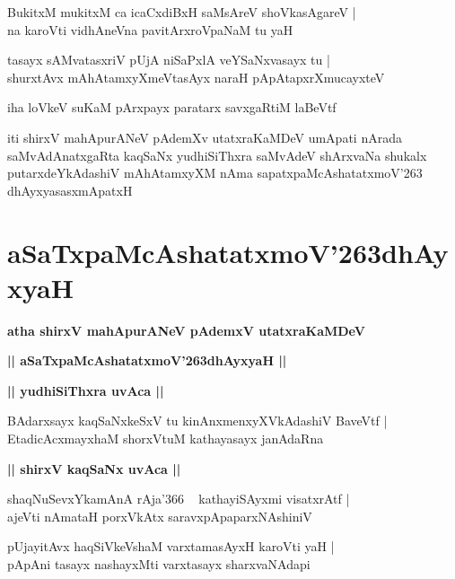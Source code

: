 \documentclass[twoside,12pt,openright]{book}
\def\S{\char'263}
\newcounter{shloka}[chapter]
\def\uvaca#1{\centerline{{\large\textbf{#1}}}}
\begin{document}
\begin{shloka}%
BukitxM mukitxM ca icaCxdiBxH saMsAreV shoVkasAgareV |\\
na karoVti vidhAneVna pavitArxroVpaNaM tu yaH 
\end{shloka}

\begin{shloka}%
tasayx sAMvatasxriV pUjA niSaPxlA veYSaNxvasayx tu |\\
shurxtAvx mAhAtamxyXmeVtasAyx naraH pApAtapxrXmucayxteV 
\end{shloka}

\begin{shloka}%
iha loVkeV suKaM pArxpayx paratarx savxgaRtiM laBeVtf
\end{shloka}

\begin{center}
iti shirxV mahApurANeV pAdemXv utatxraKaMDeV umApati nArada saMvAdAnatxgaRta kaqSaNx yudhiSiThxra 
saMvAdeV shArxvaNa shukalx putarxdeYkAdashiV mAhAtamxyXM nAma sapatxpaMcAshatatxmoV\S 
dhAyxyasasxmApatxH
\end{center}

\chapter{aSaTxpaMcAshatatxmoV\S dhAyxyaH}

\begin{center}
{\LARGE\bfseries atha shirxV mahApurANeV pAdemxV utatxraKaMDeV}
\end{center}

\begin{center}
{\LARGE\bfseries || aSaTxpaMcAshatatxmoV\S dhAyxyaH ||}
\end{center}

\uvaca{|| yudhiSiThxra uvAca ||}

\begin{shloka}%
BAdarxsayx kaqSaNxkeSxV tu kinAnxmenxyXVkAdashiV BaveVtf |\\
EtadicAcxmayxhaM shorxVtuM kathayasayx janAdaRna
\end{shloka}

\uvaca{|| shirxV kaqSaNx uvAca ||}

\begin{shloka}%
shaqNuSevxYkamAnA rAja\char'366 ~ kathayiSAyxmi visatxrAtf |\\
ajeVti nAmataH porxVkAtx saravxpApaparxNAshiniV
\end{shloka}

\begin{shloka}%
pUjayitAvx haqSiVkeVshaM varxtamasAyxH karoVti yaH |\\
pApAni tasayx nashayxMti varxtasayx sharxvaNAdapi
\end{shloka}
\end{document}
